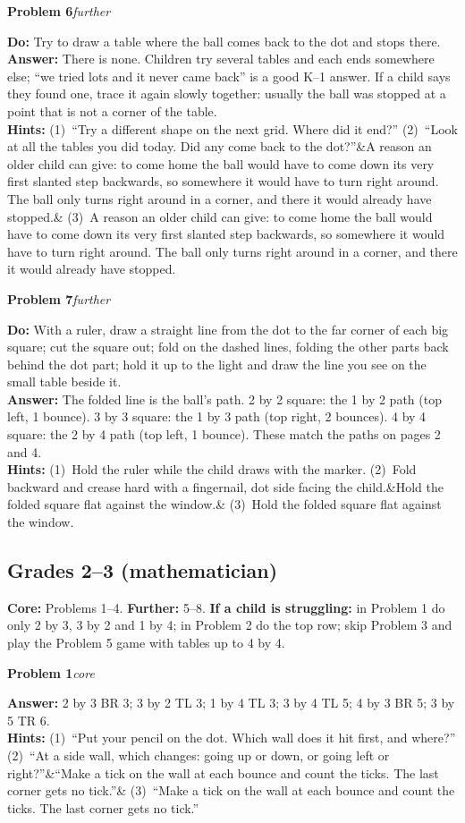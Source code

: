 \documentclass[11pt,letterpaper]{article}
\newcommand{\prob}[3]{\needspace{3\baselineskip}\par\smallskip\textbf{#1}\enspace\textit{#2}\enspace{\small(#3)}\par}
\newcommand{\what}{\textbf{Do:} }
\newcommand{\ans}{\textbf{Answer:} }
\newcommand{\hints}[3]{\textbf{Hints:} (1)~#1 (2)~#2\ifx&#3&\else{} (3)~#3\fi\par}
\newcommand{\core}{core}
\newcommand{\further}{further}
\begin{document}
\prob{Problem 6}{\further}{page 7}
\what Try to draw a table where the ball comes back to the dot and stops there.\\
\ans There is none. Children try several tables and each ends somewhere else; ``we tried lots and it never came back'' is a good K--1 answer. If a child says they found one, trace it again slowly together: usually the ball was stopped at a point that is not a corner of the table.\\
\hints{``Try a different shape on the next grid. Where did it end?''}{``Look at all the tables you did today. Did any come back to the dot?''}{A reason an older child can give: to come home the ball would have to come down its very first slanted step backwards, so somewhere it would have to turn right around. The ball only turns right around in a corner, and there it would already have stopped.}

\prob{Problem 7}{\further}{page 8}
\what With a ruler, draw a straight line from the dot to the far corner of each big square; cut the square out; fold on the dashed lines, folding the other parts back behind the dot part; hold it up to the light and draw the line you see on the small table beside it.\\
\ans The folded line is the ball's path. 2 by 2 square: the 1 by 2 path (top left, 1 bounce). 3 by 3 square: the 1 by 3 path (top right, 2 bounces). 4 by 4 square: the 2 by 4 path (top left, 1 bounce). These match the paths on pages 2 and 4.\\
\hints{Hold the ruler while the child draws with the marker.}{Fold backward and crease hard with a fingernail, dot side facing the child.}{Hold the folded square flat against the window.}

\subsection{Grades 2--3 (mathematician)}
\textbf{Core:} Problems 1--4. \textbf{Further:} 5--8. \textbf{If a child is struggling:} in Problem 1 do only 2 by 3, 3 by 2 and 1 by 4; in Problem 2 do the top row; skip Problem 3 and play the Problem 5 game with tables up to 4 by 4.

\prob{Problem 1}{\core}{page 1}
\ans 2 by 3 BR 3; 3 by 2 TL 3; 1 by 4 TL 3; 3 by 4 TL 5; 4 by 3 BR 5; 3 by 5 TR 6.\\
\hints{``Put your pencil on the dot. Which wall does it hit first, and where?''}{``At a side wall, which changes: going up or down, or going left or right?''}{``Make a tick on the wall at each bounce and count the ticks. The last corner gets no tick.''}
\end{document}
